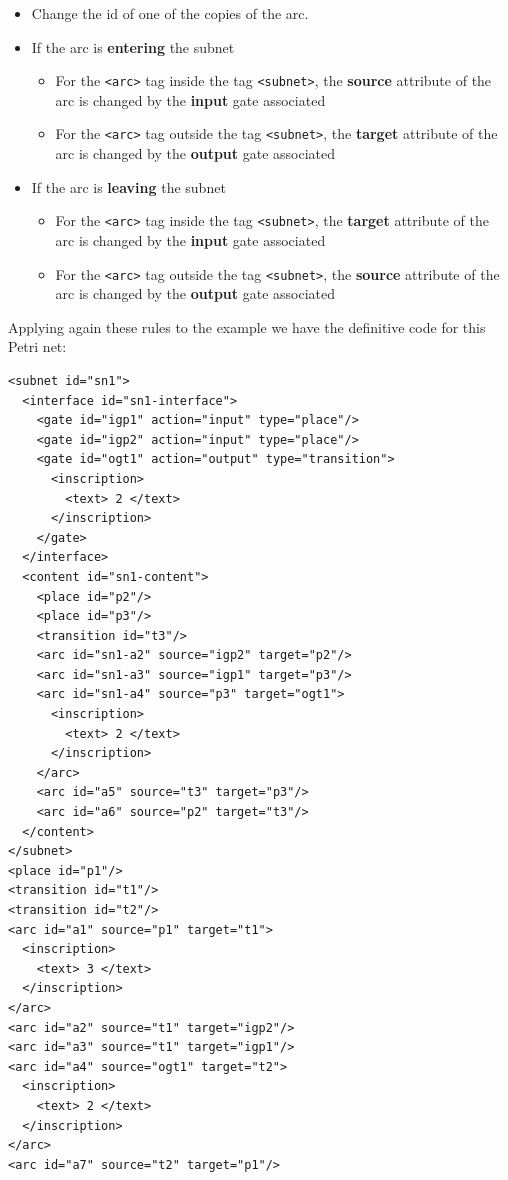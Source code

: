 \begin{itemize}
\item Change the id of one of the copies of the arc.
\item If the arc is \textbf{entering} the subnet
  \begin{itemize}
  \item For the \texttt{<arc>} tag inside the tag \texttt{<subnet>}, the \textbf{source} attribute of the arc is changed by the \textbf{input} gate associated
  \item For the \texttt{<arc>} tag outside the tag \texttt{<subnet>}, the \textbf{target} attribute of the arc is changed by the \textbf{output} gate associated
  \end{itemize}
\item If the arc is \textbf{leaving} the subnet
  \begin{itemize}
  \item For the \texttt{<arc>} tag inside the tag \texttt{<subnet>}, the \textbf{target} attribute of the arc is changed by the \textbf{input} gate associated
  \item For the \texttt{<arc>} tag outside the tag \texttt{<subnet>}, the \textbf{source} attribute of the arc is changed by the \textbf{output} gate associated
  \end{itemize}
\end{itemize}

Applying again these rules to the example we have the definitive code for this
Petri net:

\begin{lstlisting}[label=pnml_final_representation,caption=Final PNML representation]
<subnet id="sn1">
  <interface id="sn1-interface">
    <gate id="igp1" action="input" type="place"/>
    <gate id="igp2" action="input" type="place"/>
    <gate id="ogt1" action="output" type="transition">
      <inscription>
        <text> 2 </text>
      </inscription>
    </gate>
  </interface>
  <content id="sn1-content">
    <place id="p2"/>
    <place id="p3"/>
    <transition id="t3"/>
    <arc id="sn1-a2" source="igp2" target="p2"/>
    <arc id="sn1-a3" source="igp1" target="p3"/>
    <arc id="sn1-a4" source="p3" target="ogt1">
      <inscription>
        <text> 2 </text>
      </inscription>
    </arc>
    <arc id="a5" source="t3" target="p3"/>
    <arc id="a6" source="p2" target="t3"/>
  </content>
</subnet>
<place id="p1"/>
<transition id="t1"/>
<transition id="t2"/>
<arc id="a1" source="p1" target="t1">
  <inscription>
    <text> 3 </text>
  </inscription>
</arc>
<arc id="a2" source="t1" target="igp2"/>
<arc id="a3" source="t1" target="igp1"/>
<arc id="a4" source="ogt1" target="t2">
  <inscription>
    <text> 2 </text>
  </inscription>
</arc>
<arc id="a7" source="t2" target="p1"/>
\end{lstlisting}

